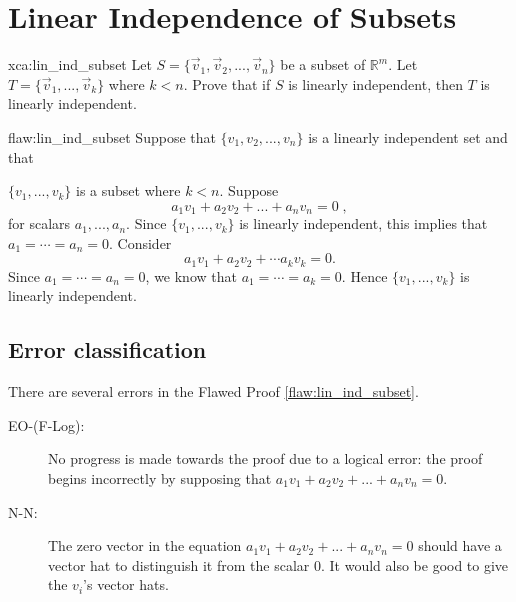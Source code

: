 \section{Linear Independence of Subsets}

\begin{xca}{xca:lin_ind_subset}
Let $ S=\{\vec{v}_1, \vec{v}_2, ..., \vec{v}_n\}$ be a subset of $\mathbb{R}^m$. Let $T=\{\vec{v}_1,...,\vec{v}_k\}$ where $k < n$. Prove that if $S$ is linearly independent, then $T$ is linearly independent.
\end{xca}

\begin{flaw}{flaw:lin_ind_subset} %
Suppose that $ \{v_1, v_2, ..., v_n\}$ is a linearly independent set and that

\noindent $\{v_1,...,v_k\}$ is a subset where $k < n$. Suppose
$$a_1v_1 + a_2v_2 + ... + a_nv_n = 0\;,$$
for scalars $a_1,..., a_n$. Since $\{v_1,...,v_k\}$ is linearly independent, this implies that $a_1=\cdots=a_n = 0$. Consider \[a_1v_1+a_2v_2+\cdots a_kv_k=0.\] Since $a_1=\cdots=a_n = 0$, we know that $a_1=\cdots=a_k = 0$. Hence $\{v_1,...,v_k\}$ is linearly independent.
\end{flaw}

\clearpage
\subsection{Error classification}


There are several errors
 in the Flawed Proof \ref{flaw:lin_ind_subset}. %


 \begin{description}
 	\item[EO-(F-Log): ] No progress is made towards the proof due to a logical error: the proof begins incorrectly by supposing that $a_1v_1 + a_2v_2 + ... + a_nv_n = 0$.
 	\item[N-N:] The zero vector in the equation $a_1v_1 + a_2v_2 + ... + a_nv_n = 0$ should have a vector hat to distinguish it from the scalar 0. It would also be good to give the $v_i$'s vector hats.
 \end{description}



